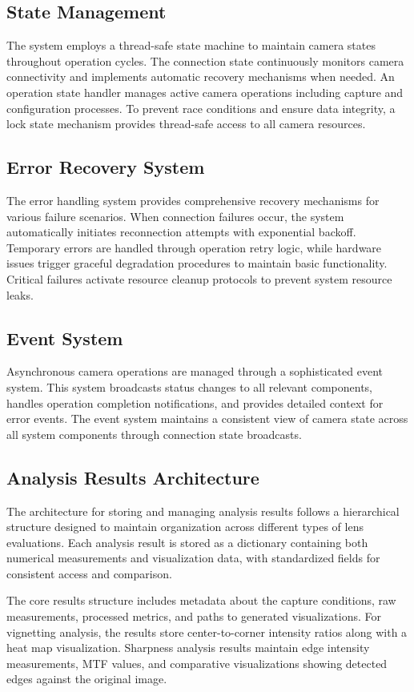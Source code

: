 \subsection{State Management}
The system employs a thread-safe state machine to maintain camera states throughout operation cycles. The connection state continuously monitors camera connectivity and implements automatic recovery mechanisms when needed. An operation state handler manages active camera operations including capture and configuration processes. To prevent race conditions and ensure data integrity, a lock state mechanism provides thread-safe access to all camera resources.

\subsection{Error Recovery System}
The error handling system provides comprehensive recovery mechanisms for various failure scenarios. When connection failures occur, the system automatically initiates reconnection attempts with exponential backoff. Temporary errors are handled through operation retry logic, while hardware issues trigger graceful degradation procedures to maintain basic functionality. Critical failures activate resource cleanup protocols to prevent system resource leaks.

\subsection{Event System}
Asynchronous camera operations are managed through a sophisticated event system. This system broadcasts status changes to all relevant components, handles operation completion notifications, and provides detailed context for error events. The event system maintains a consistent view of camera state across all system components through connection state broadcasts.

\subsection{Analysis Results Architecture}
The architecture for storing and managing analysis results follows a hierarchical structure designed to maintain organization across different types of lens evaluations. Each analysis result is stored as a dictionary containing both numerical measurements and visualization data, with standardized fields for consistent access and comparison.

The core results structure includes metadata about the capture conditions, raw measurements, processed metrics, and paths to generated visualizations. For vignetting analysis, the results store center-to-corner intensity ratios along with a heat map visualization. Sharpness analysis results maintain edge intensity measurements, MTF values, and comparative visualizations showing detected edges against the original image.

